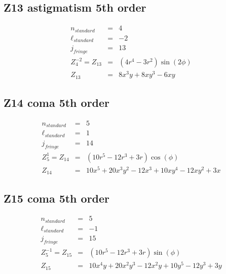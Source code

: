 \documentclass[10pt]{article}
\begin{document}
  \subsection{Z13 astigmatism 5th order}
    \begin{subequations}
    \begin{eqnarray}
        n_{standard} &=&4\\
        \ell_{standard} &=&-2\\
        j_{fringe} &=&13\\
        Z_{4}^{-2} = Z_{13} &=& \left(4 r^{4} - 3 r^{2}\right) \sin{\left(2 \phi \right)}\\
        Z_{13} &=& 8 x^{3} y + 8 x y^{3} - 6 x y
    \end{eqnarray}
    \end{subequations}
  \subsection{Z14 coma 5th order}
    \begin{subequations}
    \begin{eqnarray}
        n_{standard} &=&5\\
        \ell_{standard} &=&1\\
        j_{fringe} &=&14\\
        Z_{5}^{1} = Z_{14} &=& \left(10 r^{5} - 12 r^{3} + 3 r\right) \cos{\left(\phi \right)}\\
        Z_{14} &=& 10 x^{5} + 20 x^{3} y^{2} - 12 x^{3} + 10 x y^{4} - 12 x y^{2} + 3 x
    \end{eqnarray}
    \end{subequations}
  \subsection{Z15 coma 5th order}
    \begin{subequations}
    \begin{eqnarray}
        n_{standard} &=&5\\
        \ell_{standard} &=&-1\\
        j_{fringe} &=&15\\
        Z_{5}^{-1} = Z_{15} &=& \left(10 r^{5} - 12 r^{3} + 3 r\right) \sin{\left(\phi \right)}\\
        Z_{15} &=& 10 x^{4} y + 20 x^{2} y^{3} - 12 x^{2} y + 10 y^{5} - 12 y^{3} + 3 y
    \end{eqnarray}
    \end{subequations}
\end{document}
